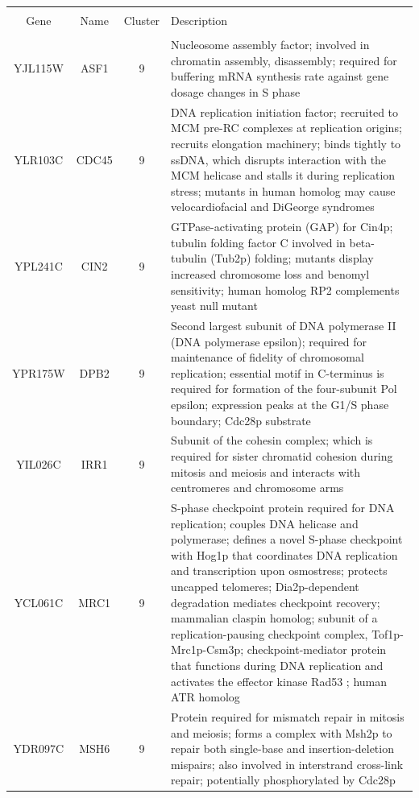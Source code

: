 \documentclass[]{article}
\begin{document}
\begin{longtable}{@{\extracolsep{3pt}} cccp{85mm}} 
\\[-1.8ex]\hline 
\hline \\[-1.8ex] 
Gene & Name & Cluster & Description \\ 
\hline \\[-1.8ex] 
YJL115W & ASF1 & 9 & Nucleosome assembly factor; involved in chromatin assembly, disassembly; required for buffering mRNA synthesis rate against gene dosage changes in S phase \\ 
YLR103C & CDC45 & 9 & DNA replication initiation factor; recruited to MCM pre-RC complexes at replication origins; recruits elongation machinery; binds tightly to ssDNA, which disrupts interaction with the MCM helicase and stalls it during replication stress; mutants in human homolog may cause velocardiofacial and DiGeorge syndromes \\ 
YPL241C & CIN2 & 9 & GTPase-activating protein (GAP) for Cin4p; tubulin folding factor C involved in beta-tubulin (Tub2p) folding; mutants display increased chromosome loss and benomyl sensitivity; human homolog RP2 complements yeast null mutant \\ 
YPR175W & DPB2 & 9 & Second largest subunit of DNA polymerase II (DNA polymerase epsilon); required for maintenance of fidelity of chromosomal replication; essential motif in C-terminus is required for formation of the four-subunit Pol epsilon; expression peaks at the G1/S phase boundary; Cdc28p substrate \\ 
YIL026C & IRR1 & 9 & Subunit of the cohesin complex; which is required for sister chromatid cohesion during mitosis and meiosis and interacts with centromeres and chromosome arms \\ 
YCL061C & MRC1 & 9 & S-phase checkpoint protein required for DNA replication; couples DNA helicase and polymerase; defines a novel S-phase checkpoint with Hog1p that coordinates DNA replication and transcription upon osmostress; protects uncapped telomeres; Dia2p-dependent degradation mediates checkpoint recovery; mammalian claspin homolog; subunit of a replication-pausing checkpoint complex, Tof1p-Mrc1p-Csm3p; checkpoint-mediator protein that functions during DNA replication and activates the effector kinase Rad53 \citep{bando2009csm3}; human ATR homolog \citep{lao2018yeast} \\ 
YDR097C & MSH6 & 9 & Protein required for mismatch repair in mitosis and meiosis; forms a complex with Msh2p to repair both single-base and insertion-deletion mispairs; also involved in interstrand cross-link repair; potentially phosphorylated by Cdc28p \\ 

\end{longtable}
\end{document}

